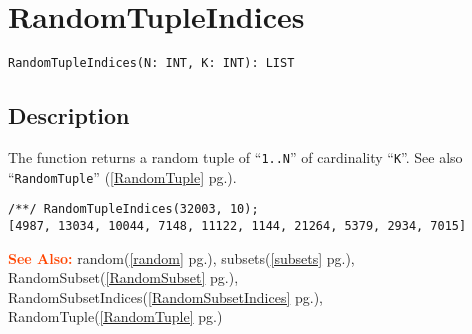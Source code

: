 \documentclass[a4paper]{mybook}
\newenvironment{command}{}{} %
\newcommand\SeeAlso{\par\textcolor{OrangeRed}{\textbf{\large See Also: }}}
\begin{document}
\section{RandomTupleIndices}
\label{RandomTupleIndices}
\begin{command} %


\begin{Verbatim}[label=syntax, rulecolor=\color{MidnightBlue},
frame=single]
RandomTupleIndices(N: INT, K: INT): LIST
\end{Verbatim}


\subsection*{Description}

The function returns a random tuple of ``\verb&1..N&'' of
cardinality ``\verb&K&''.  See also ``\verb&RandomTuple&'' (\ref{RandomTuple} pg.\pageref{RandomTuple}).
\begin{Verbatim}[label=example, rulecolor=\color{PineGreen}, frame=single]
/**/ RandomTupleIndices(32003, 10);
[4987, 13034, 10044, 7148, 11122, 1144, 21264, 5379, 2934, 7015]
\end{Verbatim}


\SeeAlso %
  random(\ref{random} pg.\pageref{random}), 
    subsets(\ref{subsets} pg.\pageref{subsets}), 
    RandomSubset(\ref{RandomSubset} pg.\pageref{RandomSubset}), 
    RandomSubsetIndices(\ref{RandomSubsetIndices} pg.\pageref{RandomSubsetIndices}), 
    RandomTuple(\ref{RandomTuple} pg.\pageref{RandomTuple})
\end{command} %
\end{document}
